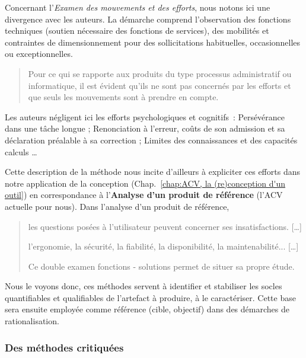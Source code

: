 Concernant l'\emph{Examen des mouvements et des efforts},
nous notons ici une divergence avec les auteurs.
La démarche comprend l'observation des fonctions techniques (soutien nécessaire des fonctions de services), des mobilités et contraintes de dimensionnement pour des sollicitations habituelles, occasionnelles ou exceptionnelles.
\blockcquote{tassinari_pratique_1997}{
Pour ce qui se rapporte aux produits du type processus administratif ou informatique, il est évident qu'ils ne sont pas concernés par les efforts et que seuls les mouvements sont à prendre en compte.
}
Les auteurs négligent ici les efforts psychologiques et cognitifs~:
Persévérance dans une tâche longue ; Renonciation à l'erreur, coûts de son admission et sa déclaration préalable à sa correction ; Limites des connaissances et des capacités calculs
\ldots

Cette description de la méthode nous incite d'ailleurs à expliciter ces efforts dans notre application de la conception (Chap.~\ref{chap:ACV, la (re)conception d'un outil}) en correspondance à l'\textbf{Analyse d'un produit de référence} (l'ACV actuelle pour nous).
Dans l'analyse d'un produit de référence,
\blockcquote{tassinari_pratique_1997}{
les questions posées à l'utilisateur peuvent concerner ses insatisfactions.
[\ldots]

l'ergonomie, la sécurité, la fiabilité, la disponibilité, la maintenabilité...
[\ldots]

Ce double examen fonctions - solutions permet de situer sa propre étude.
}

Nous le voyons donc, ces méthodes servent à identifier et stabiliser les socles quantifiables et qualifiables de l'artefact à produire, à le caractériser.
Cette base sera ensuite employée comme référence (cible, objectif) dans des démarches de rationalisation. 
\subsubsection{Des méthodes critiquées}

